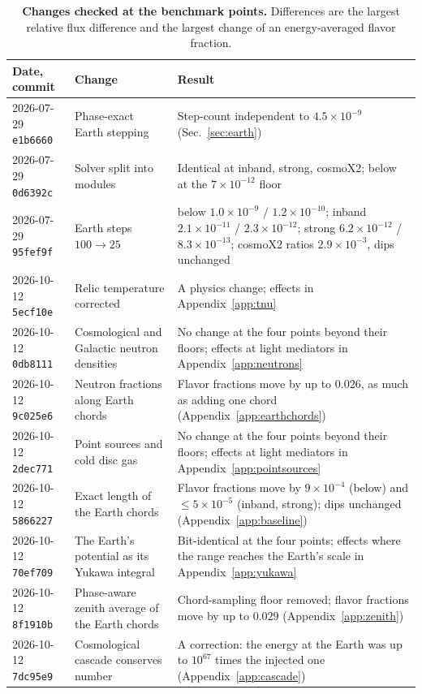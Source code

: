 \documentclass[11pt,a4paper]{article}
\begin{document}
\begin{table}[h]
\centering
\caption{\textbf{Changes checked at the benchmark points.} Differences are the largest relative
flux difference and the largest change of an energy-averaged flavor fraction.}
\label{tab:changes}
\small
\begin{tabular}{p{2.0cm}p{4.8cm}p{7.4cm}}
\toprule
Date, commit & Change & Result \\
\midrule
2026-07-29 \texttt{e1b6660} & Phase-exact Earth stepping & Step-count independent to $4.5\times10^{-9}$ (Sec.~\ref{sec:earth}) \\
2026-07-29 \texttt{0d6392c} & Solver split into modules & Identical at inband, strong, cosmoX2; below at the $7\times10^{-12}$ floor \\
2026-07-29 \texttt{95fef9f} & Earth steps $100\to25$ & below $1.0\times10^{-9}$ / $1.2\times10^{-10}$; inband $2.1\times10^{-11}$ / $2.3\times10^{-12}$; strong $6.2\times10^{-12}$ / $8.3\times10^{-13}$; cosmoX2 ratios $2.9\times10^{-3}$, dips unchanged \\
2026-10-12 \texttt{5ecf10e} & Relic temperature corrected & A physics change; effects in Appendix~\ref{app:tnu} \\
2026-10-12 \texttt{0db8111} & Cosmological and Galactic neutron densities & No change at the four points beyond their floors; effects at light mediators in Appendix~\ref{app:neutrons} \\
2026-10-12 \texttt{9c025e6} & Neutron fractions along Earth chords & Flavor fractions move by up to $0.026$, as much as adding one chord (Appendix~\ref{app:earthchords}) \\
2026-10-12 \texttt{2dec771} & Point sources and cold disc gas & No change at the four points beyond their floors; effects at light mediators in Appendix~\ref{app:pointsources} \\
2026-10-12 \texttt{5866227} & Exact length of the Earth chords & Flavor fractions move by $9\times10^{-4}$ (below) and $\le5\times10^{-5}$ (inband, strong); dips unchanged (Appendix~\ref{app:baseline}) \\
2026-10-12 \texttt{70ef709} & The Earth's potential as its Yukawa integral & Bit-identical at the four points; effects where the range reaches the Earth's scale in Appendix~\ref{app:yukawa} \\
2026-10-12 \texttt{8f1910b} & Phase-aware zenith average of the Earth chords & Chord-sampling floor removed; flavor fractions move by up to $0.029$ (Appendix~\ref{app:zenith}) \\
2026-10-12 \texttt{7dc95e9} & Cosmological cascade conserves number & A correction: the energy at the Earth was up to $10^{67}$ times the injected one (Appendix~\ref{app:cascade}) \\

\end{tabular}
\end{table}
\end{document}
